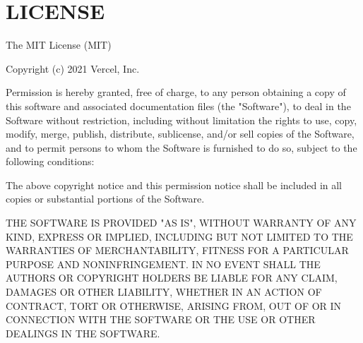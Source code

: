 \chapter{LICENSE}
\hypertarget{md__2home_2solype_2delivery_2current__days_2Mannheim_2front_2node__modules_2arg_2LICENSE}{}\label{md__2home_2solype_2delivery_2current__days_2Mannheim_2front_2node__modules_2arg_2LICENSE}
The MIT License (MIT)

Copyright (c) 2021 Vercel, Inc.

Permission is hereby granted, free of charge, to any person obtaining a copy of this software and associated documentation files (the "{}\+Software"{}), to deal in the Software without restriction, including without limitation the rights to use, copy, modify, merge, publish, distribute, sublicense, and/or sell copies of the Software, and to permit persons to whom the Software is furnished to do so, subject to the following conditions\+:

The above copyright notice and this permission notice shall be included in all copies or substantial portions of the Software.

THE SOFTWARE IS PROVIDED "{}\+AS IS"{}, WITHOUT WARRANTY OF ANY KIND, EXPRESS OR IMPLIED, INCLUDING BUT NOT LIMITED TO THE WARRANTIES OF MERCHANTABILITY, FITNESS FOR A PARTICULAR PURPOSE AND NONINFRINGEMENT. IN NO EVENT SHALL THE AUTHORS OR COPYRIGHT HOLDERS BE LIABLE FOR ANY CLAIM, DAMAGES OR OTHER LIABILITY, WHETHER IN AN ACTION OF CONTRACT, TORT OR OTHERWISE, ARISING FROM, OUT OF OR IN CONNECTION WITH THE SOFTWARE OR THE USE OR OTHER DEALINGS IN THE SOFTWARE. 